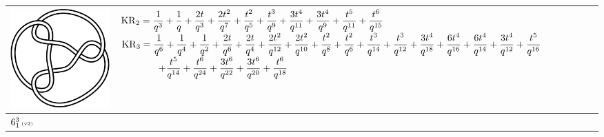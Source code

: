 \documentclass{compositio}
\theoremstyle{definition}
\numberwithin{equation}{section}
\begin{document}
{\begin{longtable}{p{}|p{}}
\includegraphics[scale=0.07,angle=0]{link6_1_3.pdf} 
& 
$
\displaystyle{%
\KR_{2} = \frac{1}{q^3}+\frac{1}{q}+\frac{2 t}{q^3}+\frac{2 t^2}{q^7}+\frac{t^2}{q^5}+\frac{t^3}{q^9}+\frac{3 t^4}{q^{11}}+\frac{3 t^4}{q^9}+\frac{t^5}{q^{11}}+\frac{t^6}{q^{15}}
}
$
\newline 
$
\displaystyle{%
\KR_{3} = \frac{1}{q^6}+\frac{1}{q^4}+\frac{1}{q^2}+\frac{2 t}{q^6}+\frac{2 t}{q^4}+\frac{2 t^2}{q^{12}}+\frac{2 t^2}{q^{10}}+\frac{t^2}{q^8}+\frac{t^2}{q^6}+\frac{t^3}{q^{14}}+\frac{t^3}{q^{12}}+\frac{3 t^4}{q^{18}}+\frac{6 t^4}{q^{16}}+\frac{6 t^4}{q^{14}}+\frac{3 t^4}{q^{12}}+\frac{t^5}{q^{16}}
}
$
\newline
$
\displaystyle{%
\qquad\qquad +\frac{t^5}{q^{14}}+\frac{t^6}{q^{24}}+\frac{3 t^6}{q^{22}}+\frac{3 t^6}{q^{20}}+\frac{t^6}{q^{18}}
}
$
\\
\hline
$6_{1}^3\,\text{{\tiny (v2)}}$ 

\end{longtable}}
\end{document}
